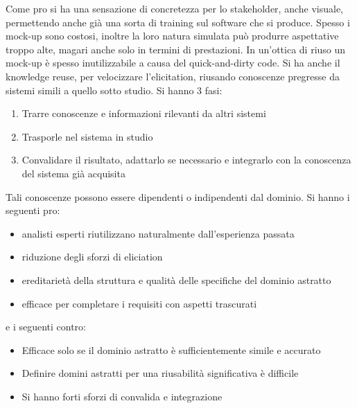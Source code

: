 \begin{itemize}
\begin{enumerate}
                    Come pro si ha una sensazione di concretezza per lo stakeholder, anche
                    visuale, permettendo anche già una sorta di training sul software che si
                    produce. Spesso i mock-up sono costosi, inoltre la loro natura simulata
                    può produrre aspettative troppo alte, magari anche solo in termini di
                    prestazioni. In un'ottica di riuso un mock-up è spesso inutilizzabile a
                    causa del quick-and-dirty code. Si ha anche il knowledge reuse, per velocizzare
                    l'elicitation, riusando conoscenze pregresse da sistemi simili a quello
                    sotto studio. Si hanno 3 fasi:
                    \begin{enumerate}
                        \item Trarre conoscenze e informazioni rilevanti da altri sistemi
                        \item Trasporle nel sistema in studio
                        \item Convalidare il risultato, adattarlo se necessario e integrarlo
                              con la conoscenza del sistema già acquisita
                    \end{enumerate}
                    Tali conoscenze possono essere dipendenti o indipendenti dal dominio.
                    Si hanno i seguenti pro:
                    \begin{itemize}
                        \item analisti esperti riutilizzano naturalmente dall'esperienza
                              passata
                        \item riduzione degli sforzi di eliciation
                        \item ereditarietà della struttura e qualità delle specifiche del
                              dominio astratto
                        \item efficace per completare i requisiti con aspetti trascurati
                    \end{itemize}
                    e i seguenti contro:
                    \begin{itemize}
                        \item Efficace solo se il dominio astratto è sufficientemente simile
                              e accurato
                        \item Definire domini astratti per una riusabilità significativa è difficile
                        \item Si hanno forti sforzi di convalida e integrazione

\end{itemize}
\end{enumerate}
\end{itemize}
